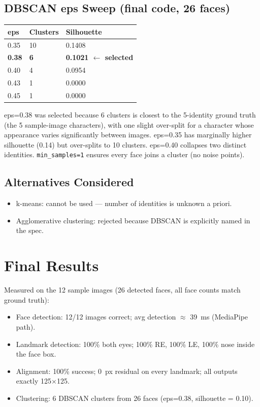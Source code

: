 \documentclass[11pt,a4paper,titlepage]{article}
\begin{document}
\subsection{DBSCAN eps Sweep (final code, 26 faces)}
\noindent
\begin{tabular}{@{}lll@{}}
\toprule
\textbf{eps} & \textbf{Clusters} & \textbf{Silhouette}~\citep{rousseeuw1987silhouettes} \\
\midrule
0.35           & 10 & 0.1408 \\
\textbf{0.38}  & \textbf{6}  & \textbf{0.1021 $\leftarrow$ selected} \\
0.40           & 4  & 0.0954 \\
0.43           & 1  & 0.0000 \\
0.45           & 1  & 0.0000 \\
\bottomrule
\end{tabular}

\smallskip
eps=0.38 was selected because 6 clusters is closest to the 5-identity ground
truth (the 5 sample-image characters), with one slight over-split for a
character whose appearance varies significantly between images. eps=0.35 has
marginally higher silhouette (0.14) but over-splits to 10 clusters. eps=0.40
collapses two distinct identities. \texttt{min\_samples=1} ensures every face
joins a cluster (no noise points).

\subsection{Alternatives Considered}
\begin{itemize}
  \item k-means: cannot be used --- number of identities is unknown a priori.
  \item Agglomerative clustering: rejected because DBSCAN is explicitly named
        in the spec.
\end{itemize}

\section{Final Results}
Measured on the 12 sample images (26 detected faces, all face counts match
ground truth):
\begin{itemize}
  \item Face detection: 12/12 images correct; avg detection $\approx$ 39~ms
        (MediaPipe path).
  \item Landmark detection: 100\% both eyes; 100\% RE, 100\% LE, 100\% nose
        inside the face box.
  \item Alignment: 100\% success; 0~px residual on every landmark; all outputs
        exactly 125$\times$125.
  \item Clustering: 6 DBSCAN clusters from 26 faces (eps=0.38, silhouette
        = 0.10).
\end{itemize}
\end{document}
